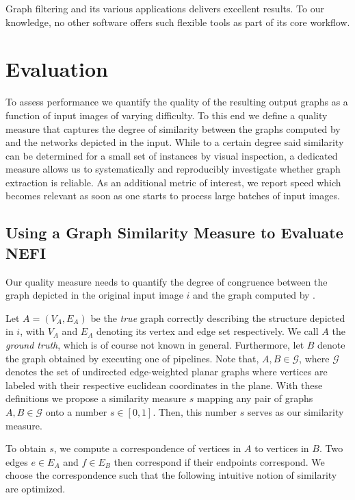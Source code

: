 		Graph filtering and its various applications delivers excellent results. To our knowledge, no other software offers such flexible tools as part of its core workflow.

\section{Evaluation}

	To assess \NEFIs performance we quantify the quality of the resulting output graphs as a function of input images of varying difficulty. To this end we define a quality measure that captures the degree of similarity between the graphs computed by \NEFI and the networks depicted in the input. While to a certain degree said similarity can be determined for a small set of instances by visual inspection, a dedicated measure allows us to systematically and reproducibly investigate whether \NEFIs graph extraction is reliable. As an additional metric of interest, we report \NEFIs speed which becomes relevant as soon as one starts to process large batches of input images. 
 
	\subsection{Using a Graph Similarity Measure to Evaluate NEFI}

		Our quality measure needs to quantify the degree of congruence between the graph depicted in the original input image $i$ and the graph computed by \NEFI.  

		Let $A = (V_A, E_A)$ be the \emph{true} graph correctly describing the structure depicted in $i$, with $V_A$ and $E_A$ denoting its vertex and edge set respectively. We call $A$ the \emph{ground truth}, which is of course not known in general. Furthermore, let $B$ denote the graph obtained by executing one of \NEFIs pipelines. Note that, $A, B \in \mathcal{G}$, where $\mathcal{G}$ denotes the set of undirected edge-weighted planar graphs where vertices are labeled with their respective euclidean coordinates in the plane. With these definitions we propose a similarity measure $s$ mapping any pair of graphs $A,B \in \mathcal{G}$ onto a number $s \in [0,1]$. Then, this number $s$ serves as our similarity measure. 

		To obtain $s$, we compute a correspondence of vertices in $A$ to vertices in $B$. Two edges $e \in E_A$ and $f \in E_B$ then correspond if their endpoints correspond. We choose the correspondence such that the following intuitive notion of similarity are optimized.


